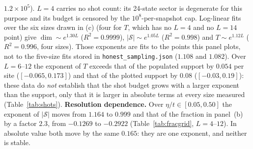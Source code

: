 {$1.2\times10^{5}$). $L=4$ carries no shot count: its 24-state sector is degenerate for this purpose
and its budget is censored by the $10^{8}$-per-snapshot cap. Log-linear fits over the six sizes drawn in (c) (four for $T$, which has no $L=4$ and no $L=14$ point)
give $\dim\sim e^{1.30L}$ ($R^2=0.9999$), $\lvert\mathcal{S}\rvert\sim e^{1.05L}$ ($R^2=0.998$) and
$T\sim e^{1.12L}$ ($R^2=0.996$, four sizes). Those exponents are fits to the points this panel plots, not to the five-size fits stored in \texttt{honest\_sampling.json} ($1.108$ and $1.082$). Over $L=6$--$12$ the exponent of $T$ exceeds that of the populated support by $0.054$ per site ($[-0.065,0.173]$) and that of the plotted support by $0.08$ ($[-0.03,0.19]$): these data do
\emph{not} establish that the shot budget grows with a larger exponent than the support, only that it
is larger in absolute terms at every size measured (Table~\ref{tab:shots}).
\textbf{Resolution dependence.} Over $\eta/t\in[0.05,0.50]$ the exponent of
$\lvert\mathcal{S}\rvert$ moves from $1.164$ to $0.999$ and that of the fraction in panel~(b) by a
factor $2.3$, from $-0.1269$ to $-0.2922$ (Table~\ref{tab:fracgrid}, $L=4$--$12$). In absolute value
both move by the same $0.165$: they are one exponent, and neither is stable.}
\label{fig:scaling}
